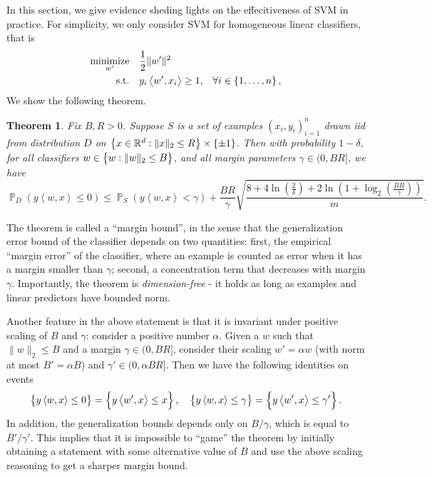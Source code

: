 \documentclass{article}
\newtheorem{theorem}{Theorem}
\DeclareMathOperator*{\minimize}{{\rm minimize}}
\DeclareMathOperator*{\st}{{\rm s.t.}}
\DeclareMathOperator*{\PP}{{\mathbb P}}
\newcommand{\RR}{\mathbb{R}} %
\newcommand{\inner}[2]{\left\langle #1,#2 \right\rangle}
\begin{document}
 In this section, we give evidence sheding lights on the effecitiveness of
  SVM in practice. For simplicity, we only consider SVM for homogeneous linear classifiers, that is
  \begin{align}
    \minimize_{w'} \quad & \frac12 \| w' \|^2 & \label{eqn:svm-h} \\
      \st \quad &  y_i \inner{w'}{x_i} \geq 1, &\forall i \in \cbr{1,\ldots,n}, \nonumber
  \end{align}
  We show the following theorem.

\begin{theorem}
Fix $B, R > 0$. Suppose $S$ is a set of examples $(x_i,y_i)_{i=1}^n$ drawn iid from distribution $D$ on $\cbr{x \in \RR^d: \| x \|_2 \leq R} \times \cbr{\pm 1}$.
Then with probability $1-\delta$, for all classifiers $w \in \cbr{w: \|w\|_2 \leq B}$, and all margin parameters
$\gamma \in (0, BR]$, we have
\[
\PP_D( y \inner{w}{x} \leq 0 )
\leq \PP_S (y \inner{w}{x} < \gamma) + \frac{BR}{\gamma} \sqrt{\frac{8 + 4\ln(\frac{2}{\delta}) + 2\ln(1+\log_2(\frac{BR}{\gamma}))}{m}}.
\]
\label{thm:mb-l2}
\end{theorem}

The theorem is called a ``margin bound'', in the sense that the generalization error bound of the classifier depends on two quantities: first, the empirical ``margin error'' of the classifier, where an example is counted as error when it has a margin smaller than $\gamma$; second, a concentration term that decreases with margin $\gamma$. Importantly, the theorem is {\em dimension-free} - it holds as long as examples and linear predictors have bounded norm.

Another feature in the above statement is that it is invariant under positive scaling of $B$ and $\gamma$: consider a positive number $\alpha$. Given a $w$ such that $\| w \|_2 \leq B$ and a margin $\gamma \in (0, BR]$, consider their scaling $w' = \alpha w$ (with norm at most $B' = \alpha B$)  and $\gamma' \in (0,\alpha BR]$. Then we have the following identities on events
\[ \cbr{y \inner{w}{x} \leq 0} = \cbr{y \inner{w'}{x} \leq x },
\quad \cbr{y \inner{w}{x} \leq \gamma} = \cbr{y \inner{w'}{x} \leq \gamma'}. \]
In addition, the generalization bounds depends only on $B/\gamma$, which is equal
to $B'/\gamma'$. This implies that it is impossible to ``game'' the theorem by initially obtaining a statement with some alternative value of $B$ and use the above scaling reasoning to get a sharper margin bound.
\end{document}
